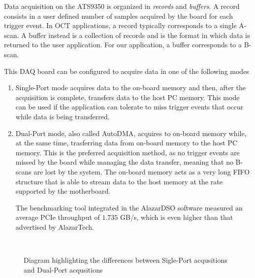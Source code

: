     Data acquisition on the ATS9350 is organized in \emph{records} and \emph{buffers}. A record consists in a user defined number of samples acquired by the board for each trigger event. In OCT applications, a record typically corresponds to a single A-scan. A buffer instead is a collection of records and is the format in which data is returned to the user application. For our application, a buffer corresponds to a B-scan. 
    
    This \ac{DAQ} board can be configured to acquire data in one of the following modes
    \begin{enumerate}
    	\item Single-Port mode acquires data to the on-board memory and then, after the acquisition is complete, transfers data to the host PC memory. This mode can be used if the application can tolerate to miss trigger events that occur while data is being transferred. 
    	
    	\item Dual-Port mode, also called AutoDMA, acquires to on-board memory while, at the same time, trasferring data from on-board memory to the host PC memory. This is the preferred acquisition method, as no trigger events are missed by the board while managing the data transfer, meaning that no B-scans are lost by the system. The on-board memory acts as a very long \ac{FIFO} structure that is able to stream data to the host memory at the rate supported by the motherboard. 
    	
    	The benchmarking tool integrated in the AlazarDSO software measured an average PCIe throughput of $1.735$ GB/s, which is even higher than that advertised by AlazarTech. 
   	
    	    	
    \end{enumerate}


\begin{figure}[bth]
	\myfloatalign
	 \\
	\caption{Diagram highlighting the differences between Sigle-Port acqusitions and Dual-Port acqusitions}\label{fig:single-vs-dual-port}
\end{figure}
    
